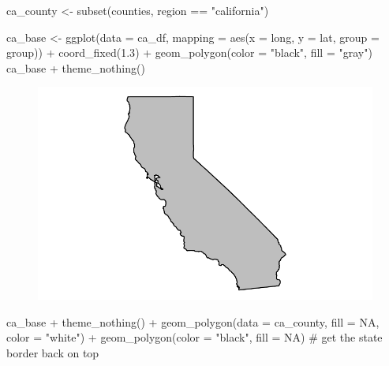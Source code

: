 \documentclass[
  letterpaper,
  DIV=11,
  numbers=noendperiod]{scrartcl}
\newenvironment{Shaded}{\begin{snugshade}}{\end{snugshade}}
\newcommand{\AttributeTok}[1]{\textcolor[rgb]{0.40,0.45,0.13}{#1}}
\newcommand{\CommentTok}[1]{\textcolor[rgb]{0.37,0.37,0.37}{#1}}
\newcommand{\ConstantTok}[1]{\textcolor[rgb]{0.56,0.35,0.01}{#1}}
\newcommand{\FloatTok}[1]{\textcolor[rgb]{0.68,0.00,0.00}{#1}}
\newcommand{\FunctionTok}[1]{\textcolor[rgb]{0.28,0.35,0.67}{#1}}
\newcommand{\NormalTok}[1]{\textcolor[rgb]{0.00,0.23,0.31}{#1}}
\newcommand{\OtherTok}[1]{\textcolor[rgb]{0.00,0.23,0.31}{#1}}
\newcommand{\SpecialCharTok}[1]{\textcolor[rgb]{0.37,0.37,0.37}{#1}}
\newcommand{\StringTok}[1]{\textcolor[rgb]{0.13,0.47,0.30}{#1}}
\begin{document}
\begin{Shaded}
\begin{Highlighting}[]
\NormalTok{ca\_county }\OtherTok{\textless{}{-}} \FunctionTok{subset}\NormalTok{(counties, region }\SpecialCharTok{==} \StringTok{"california"}\NormalTok{)}
\end{Highlighting}
\end{Shaded}

\begin{Shaded}
\begin{Highlighting}[]
\NormalTok{ca\_base }\OtherTok{\textless{}{-}} \FunctionTok{ggplot}\NormalTok{(}\AttributeTok{data =}\NormalTok{ ca\_df, }\AttributeTok{mapping =} \FunctionTok{aes}\NormalTok{(}\AttributeTok{x =}\NormalTok{ long, }\AttributeTok{y =}\NormalTok{ lat, }\AttributeTok{group =}\NormalTok{ group)) }\SpecialCharTok{+} 
  \FunctionTok{coord\_fixed}\NormalTok{(}\FloatTok{1.3}\NormalTok{) }\SpecialCharTok{+} 
  \FunctionTok{geom\_polygon}\NormalTok{(}\AttributeTok{color =} \StringTok{"black"}\NormalTok{, }\AttributeTok{fill =} \StringTok{"gray"}\NormalTok{)}
\NormalTok{ca\_base }\SpecialCharTok{+} \FunctionTok{theme\_nothing}\NormalTok{()}
\end{Highlighting}
\end{Shaded}

\begin{figure}[H]

{\centering \includegraphics{Lab17_files/figure-pdf/unnamed-chunk-28-1.pdf}

}

\end{figure}

\begin{Shaded}
\begin{Highlighting}[]
\NormalTok{ca\_base }\SpecialCharTok{+} \FunctionTok{theme\_nothing}\NormalTok{() }\SpecialCharTok{+} 
  \FunctionTok{geom\_polygon}\NormalTok{(}\AttributeTok{data =}\NormalTok{ ca\_county, }\AttributeTok{fill =} \ConstantTok{NA}\NormalTok{, }\AttributeTok{color =} \StringTok{"white"}\NormalTok{) }\SpecialCharTok{+}
  \FunctionTok{geom\_polygon}\NormalTok{(}\AttributeTok{color =} \StringTok{"black"}\NormalTok{, }\AttributeTok{fill =} \ConstantTok{NA}\NormalTok{)  }\CommentTok{\# get the state border back on top}
\end{Highlighting}
\end{Shaded}
\end{document}
